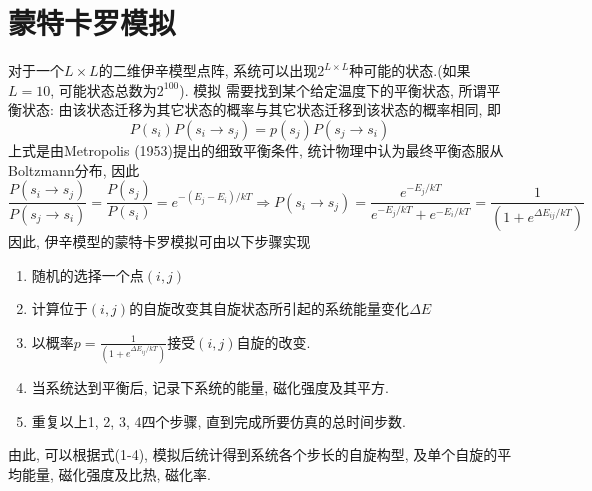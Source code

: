 \documentclass[11pt,a4paper,boxed]{caspset}
\begin{document}
\section{蒙特卡罗模拟}
对于一个$L\times L$的二维伊辛模型点阵, 系统可以出现$2^{L\times L}$种可能的状态.(如果$L=10$, 可能状态总数为$2^{100}$). 模拟 需要找到某个给定温度下的平衡状态, 所谓平衡状态: 由该状态迁移为其它状态的概率与其它状态迁移到该状态的概率相同, 即
\[
P(s_i)P(s_i\rightarrow s_j) = p(s_j)P(s_j\rightarrow s_i)
\]
上式是由Metropolis (1953)提出的细致平衡条件, 统计物理中认为最终平衡态服从Boltzmann分布, 因此
\[
\frac{P(s_i\rightarrow s_j)}{P(s_j\rightarrow s_i)} = \frac{P(s_j)}{P(s_i)} = e^{-(E_j-E_i)/kT}
\Rightarrow
P(s_i\rightarrow s_j) = \frac{e^{-E_j/kT}}{e^{-E_j/kT}+ e^{-E_i/kT}} = \frac{1}{(1+e^{\Delta E_{ij}/kT})}
\]
因此, 伊辛模型的蒙特卡罗模拟可由以下步骤实现
\begin{enumerate}
\item 随机的选择一个点$(i,j)$
\item 计算位于$(i,j)$的自旋改变其自旋状态所引起的系统能量变化$\Delta E$
\item 以概率$p=\frac{1}{(1+e^{\Delta E_{ij}/kT})}$接受$(i,j)$自旋的改变.
\item 当系统达到平衡后, 记录下系统的能量, 磁化强度及其平方.
\item 重复以上1, 2, 3, 4四个步骤, 直到完成所要仿真的总时间步数.
\end{enumerate}

由此, 可以根据式(1-4), 模拟后统计得到系统各个步长的自旋构型,  及单个自旋的平均能量, 磁化强度及比热, 磁化率.
\end{document}
